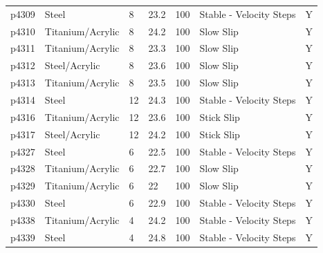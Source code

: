 \documentclass[11pt]{article}
\begin{document}
\begin{center}
\begin{tabular}{ | l l p{1.6cm} p{1.7cm} p{1.6cm} p{4cm} p{0.5cm} | }
p4309      & Steel            & 8                   & 23.2            & 100                   & Stable - Velocity Steps         & Y              \\
p4310      & Titanium/Acrylic & 8                   & 24.2            & 100                   & Slow Slip                       & Y              \\
p4311      & Titanium/Acrylic & 8                   & 23.3            & 100                   & Slow Slip                       & Y              \\
p4312      & Steel/Acrylic    & 8                   & 23.6            & 100                   & Slow Slip                       & Y              \\
p4313      & Titanium/Acrylic & 8                   & 23.5            & 100                   & Slow Slip                       & Y              \\
p4314      & Steel            & 12                  & 24.3            & 100                   & Stable - Velocity Steps         & Y              \\
p4316      & Titanium/Acrylic & 12                  & 23.6            & 100                   & Stick Slip                      & Y              \\
p4317      & Steel/Acrylic    & 12                  & 24.2            & 100                   & Stick Slip                      & Y              \\
p4327      & Steel            & 6                   & 22.5            & 100                   & Stable - Velocity Steps         & Y              \\
p4328      & Titanium/Acrylic & 6                   & 22.7            & 100                   & Slow Slip                       & Y              \\
p4329      & Titanium/Acrylic & 6                   & 22              & 100                   & Slow Slip                       & Y              \\
p4330      & Steel            & 6                   & 22.9            & 100                   & Stable - Velocity Steps         & Y              \\
p4338      & Titanium/Acrylic & 4                   & 24.2            & 100                   & Stable - Velocity Steps         & Y              \\
p4339      & Steel            & 4                   & 24.8            & 100                   & Stable - Velocity Steps         & Y              \\

\end{tabular}
\end{center}
\end{document}
